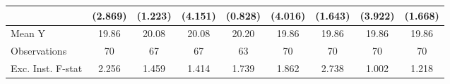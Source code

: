 {\begin{tabular}{l*{8}{c}}
                    &     (2.869)         &     (1.223)         &     (4.151)         &     (0.828)         &     (4.016)         &     (1.643)         &     (3.922)         &     (1.668)         \\
\midrule
Mean Y              &       19.86         &       20.08         &       20.08         &       20.20         &       19.86         &       19.86         &       19.86         &       19.86         \\
Observations        &          70         &          67         &          67         &          63         &          70         &          70         &          70         &          70         \\
Exc. Inst. F-stat   &       2.256         &       1.459         &       1.414         &       1.739         &       1.862         &       2.738         &       1.002         &       1.218         \\
\bottomrule
\end{tabular}
}
